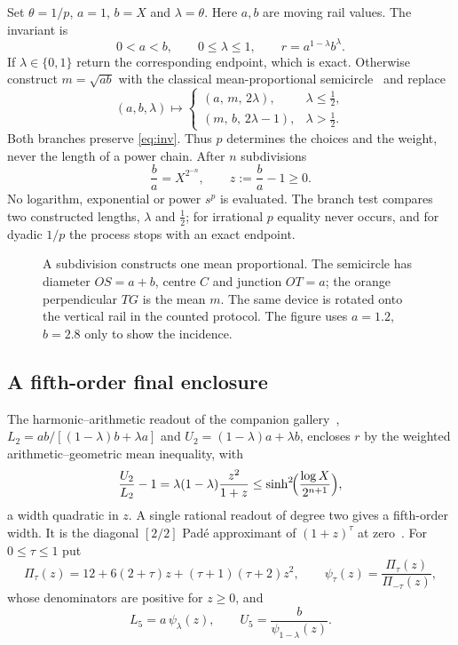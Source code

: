 Set $\theta=1/p$, $a=1$, $b=X$ and $\lambda=\theta$. Here $a,b$ are moving rail values. The invariant is
\begin{equation}\label{eq:inv}
0<a<b,\qquad 0\le\lambda\le1,\qquad r=a^{1-\lambda}b^{\lambda}.
\end{equation}
If $\lambda\in\{0,1\}$ return the corresponding endpoint, which is exact. Otherwise construct
$m=\sqrt{ab}$ with the classical mean-proportional semicircle~\cite{euclid} and replace
\begin{equation}\label{eq:subdiv}
(a,b,\lambda)\longmapsto
\begin{cases}(a,\,m,\,2\lambda),&\lambda\le\tfrac12,\\[2pt](m,\,b,\,2\lambda-1),&\lambda>\tfrac12.\end{cases}
\end{equation}
Both branches preserve \eqref{eq:inv}. Thus $p$ determines the choices and the weight, never the length
of a power chain. After $n$ subdivisions
\begin{equation}\label{eq:gap}
\frac ba=X^{2^{-n}},\qquad z:=\frac ba-1\ge0.
\end{equation}
No logarithm, exponential or power $s^{p}$ is evaluated. The branch test compares two constructed
lengths, $\lambda$ and $\tfrac12$; for irrational $p$ equality never occurs, and for dyadic $1/p$ the
process stops with an exact endpoint.

\begin{figure}[h]
\centering\figSubdivision
\caption{A subdivision constructs one mean proportional. The semicircle has diameter $OS=a+b$, centre
$C$ and junction $OT=a$; the orange perpendicular $TG$ is the mean $m$. The same device is rotated onto the vertical rail in the counted protocol.
The figure uses $a=1.2$, $b=2.8$ only to show the incidence.}\label{fig:subdiv}
\end{figure}

\subsection{A fifth-order final enclosure}

The harmonic--arithmetic readout of the companion gallery~\cite{gallery},
$L_2=ab/[(1-\lambda)b+\lambda a]$ and $U_2=(1-\lambda)a+\lambda b$, encloses $r$ by the weighted
arithmetic--geometric mean inequality, with
\[ \frac{U_2}{L_2}-1=\lambda(1-\lambda)\frac{z^{2}}{1+z}\le\sinh^{2}\!\Bigl(\frac{\log X}{2^{n+1}}\Bigr), \]
a width quadratic in $z$. A single rational readout of degree two gives a fifth-order width. It is the
diagonal $[2/2]$ Pad\'e approximant of $(1+z)^{\tau}$ at zero~\cite{dlmf,baker}. For $0\le\tau\le1$ put
\begin{equation}\label{eq:pade}
\Pi_\tau(z)=12+6(2+\tau)z+(\tau+1)(\tau+2)z^{2},\qquad
\psi_\tau(z)=\frac{\Pi_\tau(z)}{\Pi_{-\tau}(z)},
\end{equation}
whose denominators are positive for $z\ge0$, and
\begin{equation}\label{eq:L5}
L_5=a\,\psi_\lambda(z),\qquad U_5=\frac{b}{\psi_{1-\lambda}(z)}.
\end{equation}

